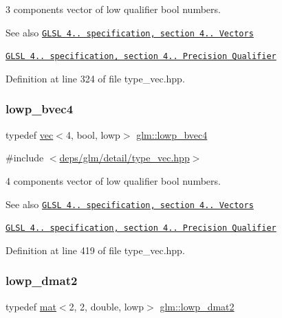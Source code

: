 3 components vector of low qualifier bool numbers.

\begin{DoxySeeAlso}{See also}
\href{http://www.opengl.org/registry/doc/GLSLangSpec.4.20.8.pdf}{\tt G\+L\+SL 4.. specification, section 4.. Vectors} 

\href{http://www.opengl.org/registry/doc/GLSLangSpec.4.20.8.pdf}{\tt G\+L\+SL 4.. specification, section 4.. Precision Qualifier} 
\end{DoxySeeAlso}


Definition at line 324 of file type\+\_\+vec.\+hpp.

\mbox{\label{group__core__precision_ga9c156bdb6dd02d35826ee77094ff3cdf}} 
\subsubsection{\texorpdfstring{lowp\+\_\+bvec4}{lowp\_bvec4}}
{\footnotesize\ttfamily typedef \hyperlink{structglm_1_1vec}{vec}$<$4, bool, lowp$>$ \hyperlink{group__core__precision_ga9c156bdb6dd02d35826ee77094ff3cdf}{glm\+::lowp\+\_\+bvec4}}



{\ttfamily \#include $<$\hyperlink{type__vec_8hpp}{deps/glm/detail/type\+\_\+vec.\+hpp}$>$}

4 components vector of low qualifier bool numbers.

\begin{DoxySeeAlso}{See also}
\href{http://www.opengl.org/registry/doc/GLSLangSpec.4.20.8.pdf}{\tt G\+L\+SL 4.. specification, section 4.. Vectors} 

\href{http://www.opengl.org/registry/doc/GLSLangSpec.4.20.8.pdf}{\tt G\+L\+SL 4.. specification, section 4.. Precision Qualifier} 
\end{DoxySeeAlso}


Definition at line 419 of file type\+\_\+vec.\+hpp.

\mbox{\label{group__core__precision_gaf2d0890fdba0e76d2bd2a169c1a71b00}} 
\subsubsection{\texorpdfstring{lowp\+\_\+dmat2}{lowp\_dmat2}}
{\footnotesize\ttfamily typedef \hyperlink{structglm_1_1mat}{mat}$<$2, 2, double, lowp$>$ \hyperlink{group__core__precision_gaf2d0890fdba0e76d2bd2a169c1a71b00}{glm\+::lowp\+\_\+dmat2}}



